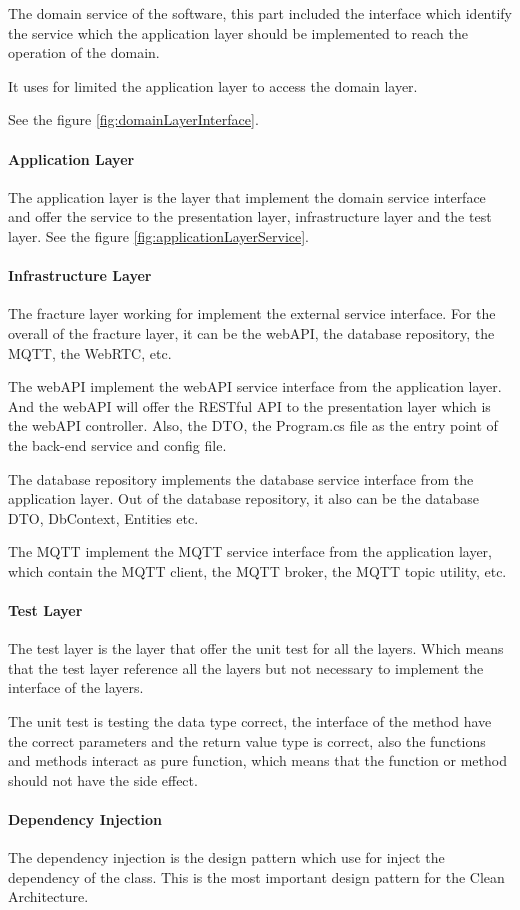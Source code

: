 

The domain service of the software, this part included the interface 
which identify the service which the application layer should be implemented
to reach the operation of the domain. 

It uses for limited the application layer to access the domain layer. 

See the figure \ref{fig:domainLayerInterface}.


\paragraph{Application Layer}
The application layer is the layer that implement the domain service interface
and offer the service to the presentation layer, infrastructure layer and the test layer.
See the figure \ref{fig:applicationLayerService}.


\paragraph{Infrastructure Layer}
The fracture layer working for implement the external service interface.
For the overall of the fracture layer, it can be the webAPI, the database repository, the MQTT, the WebRTC, etc.

The webAPI implement the webAPI service interface from the application layer.
And the webAPI will offer the RESTful API to the presentation layer which is the webAPI controller.
Also, the DTO, the Program.cs file as the entry point of the back-end service and config file.

The database repository implements the database service interface from the application layer.
Out of the database repository, it also can be the database DTO, DbContext, Entities etc.

The MQTT implement the MQTT service interface from the application layer, which contain the MQTT client,
the MQTT broker, the MQTT topic utility, etc.

\paragraph{Test Layer}
The test layer is the layer that offer the unit test for all the layers. Which means that the test layer
reference all the layers but not necessary to implement the interface of the layers.

The unit test is testing the data type correct, the interface of the method have the correct parameters 
and the return value type is correct, also the functions and methods interact as pure function, 
which means that the function or method should not have the side effect. 

\paragraph{Dependency Injection}
The dependency injection is the design pattern which use for inject the dependency of the class.
This is the most important design pattern for the Clean Architecture.

\pagebreak